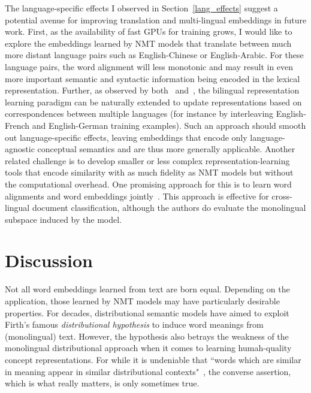 The language-specific effects I observed in Section~\ref{lang_effects} suggest a potential avenue for improving translation and multi-lingual embeddings in future work. First, as the availability of fast GPUs for training grows, I would like to explore the embeddings learned by NMT models that translate between much more distant language pairs such as English-Chinese or English-Arabic. For these language pairs, the word alignment will less monotonic and may result in even more important semantic and syntactic information being encoded in the lexical representation. Further,  as observed by both~\cite{Hermann:2014:ICLR} and~\cite{faruqui2014improving}, the bilingual representation learning paradigm can be naturally extended to update representations based on correspondences between multiple languages (for instance by interleaving English-French and English-German training examples). Such an approach should smooth out language-specific effects, leaving embeddings that encode only language-agnostic conceptual semantics and are thus more generally applicable. Another related challenge is to develop smaller or less complex representation-learning tools that encode similarity with as much fidelity as NMT models but without the computational overhead. One promising approach for this is to learn word alignments and word embeddings jointly~\citep{Kocisky:2014}. This approach is effective for cross-lingual document classification, although the authors do evaluate the monolingual subspace induced by the model.

\section{Discussion}

Not all word embeddings learned from text are born equal. Depending on the application, those learned by NMT models may have particularly desirable properties. For decades, distributional semantic models have aimed to exploit Firth's famous \emph{distributional hypothesis} to induce word meanings from (monolingual) text. However, the hypothesis also betrays the weakness of the monolingual distributional approach when it comes to learning humah-quality concept representations. For while it is undeniable that ``words which are similar in meaning appear in similar distributional contexts"~\citep{dist}, the converse assertion, which is what really matters, is only sometimes true. 


